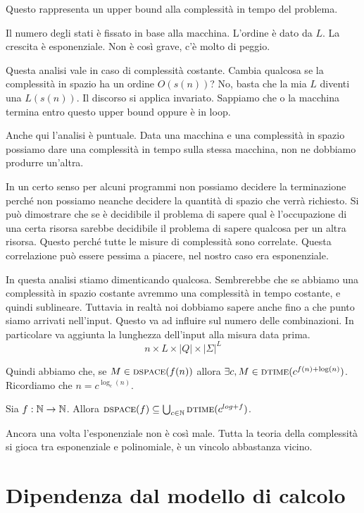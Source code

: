 Questo rappresenta un upper bound alla complessità in tempo del problema.

Il numero degli stati è fissato in base alla macchina. L'ordine è dato da $L$. La crescita è
esponenziale. Non è così grave, c'è molto di peggio.

Questa analisi vale in caso di complessità costante. Cambia qualcosa se la complessità in spazio
ha un ordine $O(s(n))$? No, basta che la mia $L$ diventi una $L(s(n))$. Il discorso si applica
invariato. Sappiamo che o la macchina termina entro questo upper bound oppure è in loop.

Anche qui l'analisi è puntuale. Data una macchina e una complessità in spazio possiamo dare una
complessità in tempo sulla stessa macchina, non ne dobbiamo produrre un'altra.

In un certo senso per alcuni programmi non possiamo decidere la terminazione perché non possiamo
neanche decidere la quantità di spazio che verrà richiesto. Si può dimostrare che se è decidibile il
problema di sapere qual è l'occupazione di una certa risorsa sarebbe decidibile il problema di sapere
qualcosa per un altra risorsa. Questo perché tutte le misure di complessità sono correlate. Questa
correlazione può essere pessima a piacere, nel nostro caso era esponenziale.

In questa analisi stiamo dimenticando qualcosa. Sembrerebbe che se abbiamo una complessità in
spazio costante avremmo una complessità in tempo costante, e quindi sublineare. Tuttavia in realtà
noi dobbiamo sapere anche fino a che punto siamo arrivati nell'input. Questo va ad influire sul
numero delle combinazioni. In particolare va aggiunta la lunghezza dell'input alla misura data
prima.
\begin{equation*}
    n\times L \times |Q| \times |\Sigma|^{L}
\end{equation*}

Quindi abbiamo che, se $M \in \textsc{dspace}(f(n))$ allora $\exists c, M \in \textsc{dtime}(c^{f(n) + \log(n)})$.
Ricordiamo che $n = c^{\log_{c}(n)}$.

\begin{thm}
    Sia $f: \mathbb{N} \to \mathbb{N}$. Allora $\textsc{dspace}(f) \subseteq \bigcup_{c \in \mathbb{N}}\textsc{dtime}(c^{log + f})$.
\end{thm}

Ancora una volta l'esponenziale non è così male. Tutta la teoria della complessità si gioca tra
esponenziale e polinomiale, è un vincolo abbastanza vicino.

\section{Dipendenza dal modello di calcolo}

